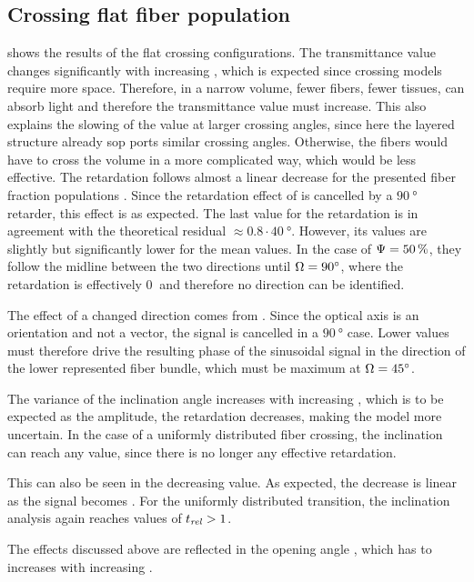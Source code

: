 \subsection{Crossing flat fiber population}
 shows the results of the flat crossing configurations.
The transmittance value changes significantly with increasing \modelOmega{}, which is expected since crossing models require more space.
Therefore, in a narrow volume, fewer fibers, \ie{} fewer tissues, can absorb light and therefore the transmittance value must increase.
This also explains the slowing of the value at larger crossing angles, since here the layered structure already sop ports similar crossing angles.
Otherwise, the fibers would have to cross the volume in a more complicated way, which would be less effective.
%
The retardation follows almost a linear decrease for the presented fiber fraction populations \modelPsi{}.
Since the retardation effect of is cancelled by a $\SI{90}{\degree}$ retarder, this effect is as expected.
The last value for the retardation is in agreement with the theoretical residual $\approx 0.8\cdot \SI{40}{\degree}$.
However, its values are slightly but significantly lower for the mean \trel{} values.
In the case of $\textnormal{$\Psi$}{} = \SI{50}{\percent}$, they follow the midline between the two directions until $\textnormal{$\Omega$}=\SI{90}{\degree}$, where the retardation is effectively $\SI{0}{}$ and therefore no direction can be identified.
\par
%
The effect of a changed direction comes from \dummy{}.
Since the optical axis is an orientation and not a vector, the signal is cancelled in a $\SI{90}{\degree}$ case.
Lower values must therefore drive the resulting phase of the sinusoidal signal in the direction of the lower represented fiber bundle, which must be maximum at $\textnormal{$\Omega$}=\SI{45}{\degree}$.
\par
%
The variance of the inclination angle increases with increasing \modelOmega{}, which is to be expected as the amplitude, \ie{} the retardation decreases, making the model more uncertain.
In the case of a uniformly distributed fiber crossing, the inclination can reach any value, since there is no longer any effective retardation.
\par
%
This can also be seen in the decreasing \trel{} value.
As expected, the decrease is linear as the signal becomes \dummy{}.
For the uniformly distributed transition, the inclination analysis again reaches values of $\textnormal{$t_\mathit{rel}$}>1$.
\par
%
The effects discussed above are reflected in the opening angle \openingAngle{}, which has to increases with increasing \modelOmega{}.
%
%
%
